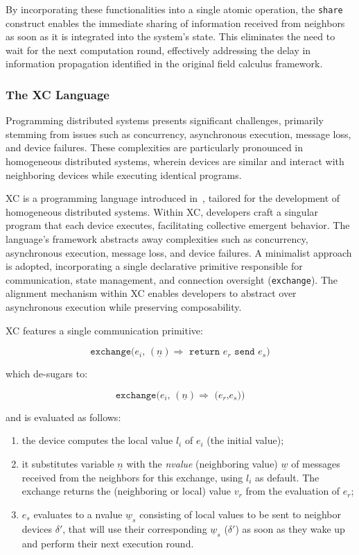 By incorporating these functionalities into a single atomic operation, the \texttt{share} construct enables the immediate sharing of information received from neighbors as soon as it is integrated into the system's state. This eliminates the need to wait for the next computation round, effectively addressing the delay in information propagation identified in the original field calculus framework.

\subsubsection{The XC Language}

Programming distributed systems presents significant challenges, primarily stemming from issues such as concurrency, asynchronous execution, message loss, and device failures. These complexities are particularly pronounced in homogeneous distributed systems, wherein devices are similar and interact with neighboring devices while executing identical programs.

XC is a programming language introduced in~\cite{https://doi.org/10.4230/lipics.ecoop.2022.20}, tailored for the development of homogeneous distributed systems. Within XC, developers craft a singular program that each device executes, facilitating collective emergent behavior. The language's framework abstracts away complexities such as concurrency, asynchronous execution, message loss, and device failures. A minimalist approach is adopted, incorporating a single declarative primitive responsible for communication, state management, and connection oversight (\texttt{exchange}). The alignment mechanism within XC enables developers to abstract over asynchronous execution while preserving composability.

XC features a single communication primitive:

\[ \texttt{exchange($e_i$, $(\underline{n}) \Rightarrow$ return $e_r$ send $e_s$)} \]

which de-sugars to:

\[ \texttt{exchange($e_i$, $(\underline{n}) \Rightarrow$ ($e_r$,$e_s$))} \]

and is evaluated as follows:

\begin{enumerate}
    \item the device computes the local value $l_i$ of $e_i$ (the initial value);
    \item it substitutes variable $\underline{n}$ with the \textit{nvalue} (neighboring value) $\underline{w}$ of messages received from the neighbors for this exchange, using $l_i$ as default. The exchange returns the (neighboring or local) value $v_r$ from the evaluation of $e_r$;
    \item $e_s$ evaluates to a nvalue $\underline{w}_s$ consisting of local values to be sent to neighbor devices $\delta'$, that will use their corresponding $\underline{w}_s$ ($\delta'$) as soon as they wake up and perform their next execution round.
\end{enumerate}

